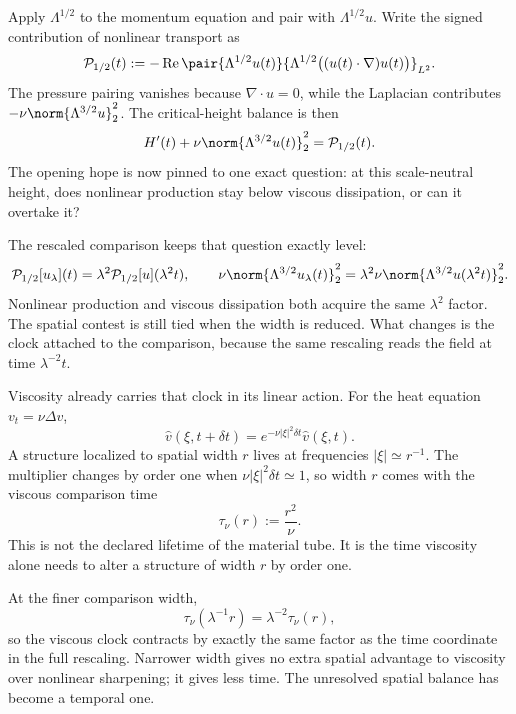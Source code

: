 
Apply \(\Lambda^{1/2}\) to the momentum equation and pair with \(\Lambda^{1/2}u\). Write the signed contribution of nonlinear transport as
\[
  \mathcal P_{1/2}(t)
  :=
  -\operatorname{Re}
  \pair
    {\Lambda^{1/2}u(t)}
    {\Lambda^{1/2}\bigl((u(t)\cdot\nabla)u(t)\bigr)}_{L^2}.
\]
The pressure pairing vanishes because \(\nabla\cdot u=0\), while the Laplacian contributes \(-\nu\norm{\Lambda^{3/2}u}_2^2\). The critical-height balance is then
\[
  H'(t)
  +
  \nu\norm{\Lambda^{3/2}u(t)}_2^2
  =
  \mathcal P_{1/2}(t).
\]
The opening hope is now pinned to one exact question: at this scale-neutral height, does nonlinear production stay below viscous dissipation, or can it overtake it?

The rescaled comparison keeps that question exactly level:
\[
  \mathcal P_{1/2}[u_\lambda](t)
  =
  \lambda^2\mathcal P_{1/2}[u](\lambda^2t),
  \qquad
  \nu\norm{\Lambda^{3/2}u_\lambda(t)}_2^2
  =
  \lambda^2\nu\norm{\Lambda^{3/2}u(\lambda^2t)}_2^2.
\]
Nonlinear production and viscous dissipation both acquire the same \(\lambda^2\) factor. The spatial contest is still tied when the width is reduced. What changes is the clock attached to the comparison, because the same rescaling reads the field at time \(\lambda^{-2}t\).


Viscosity already carries that clock in its linear action. For the heat equation \(v_t=\nu\Delta v\),
\[
  \widehat v(\xi,t+\delta t)
  =
  e^{-\nu|\xi|^2\delta t}\widehat v(\xi,t).
\]
A structure localized to spatial width \(r\) lives at frequencies \(|\xi|\simeq r^{-1}\). The multiplier changes by order one when \(\nu|\xi|^2\delta t\simeq1\), so width \(r\) comes with the viscous comparison time
\[
  \tau_\nu(r)
  :=
  \frac{r^2}{\nu}.
\]
This is not the declared lifetime of the material tube. It is the time viscosity alone needs to alter a structure of width \(r\) by order one.

At the finer comparison width,
\[
  \tau_\nu(\lambda^{-1}r)
  =
  \lambda^{-2}\tau_\nu(r),
\]
so the viscous clock contracts by exactly the same factor as the time coordinate in the full \NavierStokes{} rescaling. Narrower width gives no extra spatial advantage to viscosity over nonlinear sharpening; it gives less time. The unresolved spatial balance has become a temporal one.


